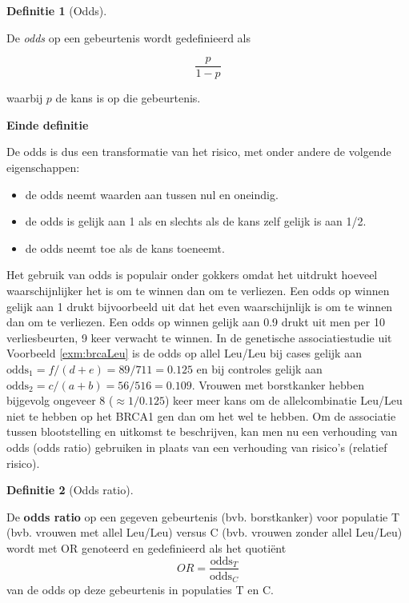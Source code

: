 \documentclass[
  12pt,dutch,coursenotes]{book}
\theoremstyle{definition}
\newtheorem{definition}{Definitie}[chapter]
\theoremstyle{definition}
\theoremstyle{definition}
\theoremstyle{remark}
\begin{document}
\begin{definition}[Odds]
\protect\hypertarget{def:unnamed-chunk-112}{}{\label{def:unnamed-chunk-112} \iffalse (Odds) \fi{} }
\end{definition}
De \emph{odds} op een gebeurtenis wordt gedefinieerd als

\begin{equation*}
\frac{p}{1-p}
\end{equation*}

waarbij \(p\) de kans is op die gebeurtenis.

\textbf{Einde definitie}

De odds is dus een transformatie van het risico, met onder andere de
volgende eigenschappen:

\begin{itemize}
\item
  de odds neemt waarden aan tussen nul en oneindig.
\item
  de odds is gelijk aan 1 als en slechts als de kans zelf gelijk is aan
  1/2.
\item
  de odds neemt toe als de kans toeneemt.
\end{itemize}

Het gebruik van odds is populair onder gokkers omdat het uitdrukt hoeveel
waarschijnlijker het is om te winnen dan om te verliezen. Een odds op winnen
gelijk aan 1 drukt bijvoorbeeld uit dat het even waarschijnlijk is om te
winnen dan om te verliezen. Een odds op winnen gelijk aan 0.9 drukt uit men
per 10 verliesbeurten, 9 keer verwacht te winnen. In de genetische associatiestudie uit Voorbeeld \ref{exm:brcaLeu}
is de odds op allel Leu/Leu bij cases gelijk aan
\(\mbox{odds}_1=f/(d+e)=89/711=0.125\) en bij controles gelijk aan \(\mbox{odds}_2=c/(a+b)=56/516=0.109\). Vrouwen met borstkanker hebben bijgevolg ongeveer 8 (\(\approx 1/0.125\)) keer meer kans om de allelcombinatie Leu/Leu niet te hebben op het BRCA1 gen dan om het wel te hebben.
Om de associatie tussen blootstelling
en uitkomst te beschrijven, kan men nu een verhouding van odds (odds ratio)
gebruiken in plaats van een verhouding van risico's (relatief risico).

\begin{definition}[Odds ratio]
\protect\hypertarget{def:unnamed-chunk-113}{}{\label{def:unnamed-chunk-113} \iffalse (Odds ratio) \fi{} }
\end{definition}
De \textbf{odds ratio} op een gegeven gebeurtenis (bvb. borstkanker) voor populatie T (bvb. vrouwen met allel Leu/Leu) versus C (bvb. vrouwen zonder allel Leu/Leu) wordt met OR genoteerd en gedefinieerd als het quotiënt
\begin{equation*}
OR=\frac{\mbox{odds}_T}{\mbox{odds}_C}
\end{equation*}
van de odds op deze gebeurtenis in populaties T en C.
\end{document}
